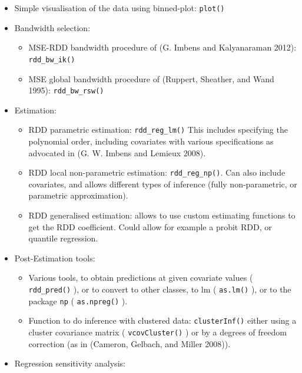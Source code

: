 \documentclass[article]{jss}
\begin{document}
\begin{itemize}
\itemsep1pt\parskip0pt
\item
  Simple visualisation of the data using binned-plot: \texttt{plot()}
\item
  Bandwidth selection:

  \begin{itemize}
  \itemsep1pt\parskip0pt
  \item
    MSE-RDD bandwidth procedure of (G. Imbens and Kalyanaraman 2012):
    \texttt{rdd\_bw\_ik()}
  \item
    MSE global bandwidth procedure of (Ruppert, Sheather, and Wand
    1995): \texttt{rdd\_bw\_rsw()}
  \end{itemize}
\item
  Estimation:

  \begin{itemize}
  \itemsep1pt\parskip0pt
  \item
    RDD parametric estimation: \texttt{rdd\_reg\_lm()} This includes
    specifying the polynomial order, including covariates with various
    specifications as advocated in (G. W. Imbens and Lemieux 2008).
  \item
    RDD local non-parametric estimation: \texttt{rdd\_reg\_np()}. Can
    also include covariates, and allows different types of inference
    (fully non-parametric, or parametric approximation).
  \item
    RDD generalised estimation: allows to use custom estimating
    functions to get the RDD coefficient. Could allow for example a
    probit RDD, or quantile regression.
  \end{itemize}
\item
  Post-Estimation tools:

  \begin{itemize}
  \itemsep1pt\parskip0pt
  \item
    Various tools, to obtain predictions at given covariate values (
    \texttt{rdd\_pred()} ), or to convert to other classes, to lm (
    \texttt{as.lm()} ), or to the package \texttt{np} (
    \texttt{as.npreg()} ).
  \item
    Function to do inference with clustered data: \texttt{clusterInf()}
    either using a cluster covariance matrix ( \texttt{vcovCluster()} )
    or by a degrees of freedom correction (as in (Cameron, Gelbach, and
    Miller 2008)).
  \end{itemize}
\item
  Regression sensitivity analysis:


\end{itemize}
\end{document}
